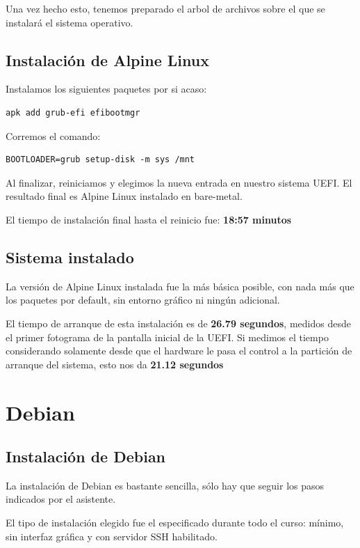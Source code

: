 \documentclass[11pt, letterpaper]{article}
\begin{document}
Una vez hecho esto, tenemos preparado el arbol de archivos sobre el que se instalará el sistema operativo.
\subsection{Instalación de Alpine Linux}
\label{sec:org2038ce6}

Instalamos los siguientes paquetes por si acaso:

\begin{verbatim}
apk add grub-efi efibootmgr
\end{verbatim}

Corremos el comando:

\begin{verbatim}
BOOTLOADER=grub setup-disk -m sys /mnt
\end{verbatim}

Al finalizar, reiniciamos y elegimos la nueva entrada en nuestro sistema UEFI. El resultado final es Alpine Linux instalado en bare-metal.

El tiempo de instalación final hasta el reinicio fue: \textbf{18:57 minutos}
\subsection{Sistema instalado}
\label{sec:orge3948ff}

La versión de Alpine Linux instalada fue la más básica posible, con nada más que los paquetes por default, sin entorno gráfico ni ningún adicional.

El tiempo de arranque de esta instalación es de \textbf{26.79 segundos}, medidos desde el primer fotograma de la pantalla inicial de la UEFI. Si medimos el tiempo considerando solamente desde que el hardware le pasa el control a la partición de arranque del sistema, esto nos da \textbf{21.12 segundos}
\section{Debian}
\label{sec:org95e246a}

\subsection{Instalación de Debian}
\label{sec:orgeacf485}

La instalación de Debian es bastante sencilla, sólo hay que seguir los pasos indicados por el asistente.

El tipo de instalación elegido fue el especificado durante todo el curso: mínimo, sin interfaz gráfica y con servidor SSH habilitado.
\end{document}
